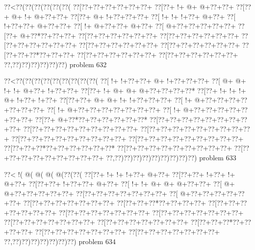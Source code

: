 \vbox{\vbox{\goo
\0??<\0??(\0??(\0??(\0??(\0??(\0??(
\0??[\0??+\0??+\0??+\0??+\0??+\0??+
\0??[\0??+\- !+\- @+\- @+\0??+\0??+
\0??[\0??+\- @+\- !+\- @+\0??+\0??+
\0??[\0??+\- @+\- !+\0??+\0??+\0??+
\0??[\- !+\- !+\- !+\0??+\- @+\0??+
\0??[\- !+\0??+\0??+\- @+\0??+\0??+
\0??[\- !+\- @+\0??+\0??+\- @+\0??+
\0??[\- @+\0??+\0??+\0??+\0??+\0??+
\0??[\0??+\- @+\0??*\0??+\0??+\0??+
\0??[\0??+\0??+\0??+\0??+\0??+\0??+
\0??[\0??+\0??+\0??+\0??+\0??+\0??+
\0??[\0??+\0??+\0??+\0??+\0??+\0??+
\0??[\0??+\0??+\0??+\0??+\0??+\0??+
\0??[\0??+\0??+\0??+\0??+\0??+\0??+
\0??[\0??+\0??+\0??*\0??+\0??+\0??+
\0??[\0??+\0??+\0??+\0??+\0??+\0??+
\0??[\0??+\0??+\0??+\0??+\0??+\0??+
\0??,\0??)\0??)\0??)\0??)\0??)\0??)
}
\hfil problem 632\hfil\break
}

\vbox{\vbox{\goo
\0??<\0??(\0??(\0??(\0??(\0??(\0??(\0??(\0??(\0??(
\0??[\- !+\- !+\0??+\0??+\- @+\- !+\0??+\0??+\0??+
\0??[\- @+\- @+\- !+\- !+\- @+\0??+\- !+\0??+\0??+
\0??[\0??+\- !+\- @+\- @+\- @+\0??+\0??+\0??+\0??*
\0??[\0??+\- !+\- !+\- !+\- @+\- !+\0??+\- !+\0??+
\0??[\0??+\0??+\- @+\- @+\- !+\- !+\0??+\0??+\0??+
\0??[\- !+\- @+\0??+\0??+\0??+\0??+\0??+\0??+\0??+
\0??[\- !+\- @+\0??+\0??+\0??+\0??+\0??+\0??+\0??+
\0??[\- !+\- @+\0??+\0??+\0??+\0??+\0??+\0??+\0??+
\0??[\0??+\- @+\0??*\0??+\0??+\0??+\0??+\0??+\0??*
\0??[\0??+\0??+\0??+\0??+\0??+\0??+\0??+\0??+\0??+
\0??[\0??+\0??+\0??+\0??+\0??+\0??+\0??+\0??+\0??+
\0??[\0??+\0??+\0??+\0??+\0??+\0??+\0??+\0??+\0??+
\0??[\0??+\0??+\0??+\0??+\0??+\0??+\0??+\0??+\0??+
\0??[\0??+\0??+\0??+\0??+\0??+\0??+\0??+\0??+\0??+
\0??[\0??+\0??+\0??*\0??+\0??+\0??+\0??+\0??+\0??*
\0??[\0??+\0??+\0??+\0??+\0??+\0??+\0??+\0??+\0??+
\0??[\0??+\0??+\0??+\0??+\0??+\0??+\0??+\0??+\0??+
\0??,\0??)\0??)\0??)\0??)\0??)\0??)\0??)\0??)\0??)
}
\hfil problem 633\hfil\break
}

\vbox{\vbox{\goo
\0??<\- !(\- @(\- @(\- @(\- @(\0??(\0??(
\0??[\0??+\- !+\- !+\- !+\0??+\- @+\0??+
\0??[\0??+\0??+\- !+\0??+\- !+\- @+\0??+
\0??[\0??+\0??+\- !+\0??+\0??+\- @+\0??+
\0??[\- !+\- !+\- @+\- @+\- @+\0??+\0??+
\0??[\- @+\- @+\0??+\0??+\0??+\0??+\0??+
\0??[\0??+\0??+\0??+\0??+\0??+\0??+\0??+
\0??[\- @+\0??+\0??+\0??+\0??+\0??+\0??+
\0??[\0??+\0??+\0??+\0??+\0??+\0??+\0??+
\0??[\0??+\0??+\0??*\0??+\0??+\0??+\0??+
\0??[\0??+\0??+\0??+\0??+\0??+\0??+\0??+
\0??[\0??+\0??+\0??+\0??+\0??+\0??+\0??+
\0??[\0??+\0??+\0??+\0??+\0??+\0??+\0??+
\0??[\0??+\0??+\0??+\0??+\0??+\0??+\0??+
\0??[\0??+\0??+\0??+\0??+\0??+\0??+\0??+
\0??[\0??+\0??+\0??*\0??+\0??+\0??+\0??+
\0??[\0??+\0??+\0??+\0??+\0??+\0??+\0??+
\0??[\0??+\0??+\0??+\0??+\0??+\0??+\0??+
\0??,\0??)\0??)\0??)\0??)\0??)\0??)\0??)
}
\hfil problem 634\hfil\break
}


